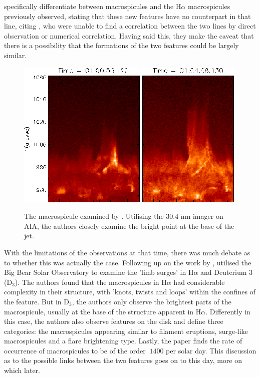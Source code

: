 \cite{Bohlin1975} specifically differentiate between macrospicules and the H$\alpha$ macrospicules previously observed, stating that these new features have no counterpart in that line, citing \cite{Engvold1975}, who were unable to find a correlation between the two lines by direct observation or numerical correlation.
Having said this, they make the caveat that there is a possibility that the formations of the two features could be largely similar.

\begin{figure}
	\centering
	\includegraphics[scale=0.7]{Chapter2/Figs/MS1}
	\includegraphics[scale=0.7]{Chapter2/Figs/MS2}
	\caption{The macrospicule examined by \cite{Kayshap2013}. Utilising the $30.4$ nm imager on AIA, the authors closely examine the bright point at the base of the jet.}
\end{figure}


With the limitations of the observations at that time, there was much debate as to whether this was actually the case. 
Following up on the work by \cite{Bohlin1975}, \cite{LaBonte79} utilised the Big Bear Solar Observatory to examine the 'limb surges' in H$\alpha$ and Deuterium 3 (D$_3$).
The authors found that the macrospicules in H$\alpha$ had considerable complexity in their structure, with 'knots, twists and loops' within the confines of the feature.
But in D$_3$, the authors only observe the brightest parts of the macrospicule, usually at the base of the structure apparent in H$\alpha$.
Differently in this case, the authors also observe features on the disk and define three categories: the macrospicules appearing similar to filament eruptions, surge-like macrospicules and a flare brightening type.
Lastly, the paper finds the rate of occurrence of macrospicules to be of the order $~1400$ per solar day. 
This discussion as to the possible links between the two features goes on to this day, more on which later.

